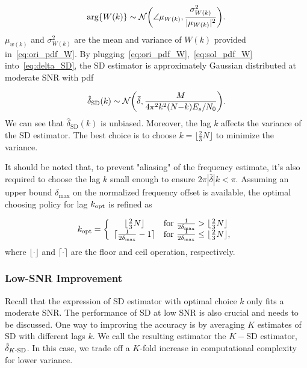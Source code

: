 \begin{equation}
    \label{eq:sol_pdf_W}
    \arg\{W(k)\} \sim \mathcal{N}\bigg(\angle \mu_{W(k)},\frac{\sigma^2_{W(k)}}{|\mu_{W(k)}|^2}\bigg).
  \end{equation}
$\mu_{w(k)}$ and $\sigma^2_{W(k)}$ are the mean and variance of $W(k)$ provided in~\eqref{eq:ori_pdf_W}.
By plugging~\eqref{eq:ori_pdf_W},~\eqref{eq:sol_pdf_W} into~\eqref{eq:delta_SD}, the SD estimator
is approximately Gaussian distributed at moderate SNR with pdf

\begin{equation}
    \label{eq:pdf_delta}
        \hat{\delta}_{\text{SD}}(k) \sim \mathcal{N} \bigg(\bar{\delta},\frac{M}{4\pi^2k^2(N{-}k)E_s/N_0}\bigg).
  \end{equation}  
We can see that $\hat{\delta}_{\text{SD}}(k)$ is unbiased. Moreover, the lag $k$ affects the variance of the SD estimator. 
The best choice is to choose $k=\lfloor\frac{2}{3}N\rfloor$ to minimize the variance.

It should be noted that, to prevent "aliasing" of the frequency estimate, it's also required to choose the lag $k$ small enough to ensure $2\pi |\bar{\delta}| k < \pi$.
Assuming an upper bound $\delta_{\text{max}}$ on the normalized frequency offset is available, 
the optimal choosing policy for lag $k_{\text{opt}}$ is refined as

\begin{equation}
    \label{eq:est_k_opt}
    k_{\text{opt}}=\left\{
      \begin{array}{cl}
        \lfloor\frac{2}{3}N\rfloor
        & \text{for $\frac{1}{2\delta_{\max}}>\lfloor\frac{2}{3}N\rfloor$} \\
        \lceil\frac{1}{2\delta_{\max}}-1\rceil
        & \text{for $\frac{1}{2\delta_{\max}} \leq\lfloor\frac{2}{3}N\rfloor$},
      \end{array}
    \right.
  \end{equation}
where $\lfloor \cdot \rfloor$ and $\lceil \cdot \rceil$ are the floor and ceil operation, respectively.

\subsubsection{Low-SNR Improvement}
Recall that the expression of SD estimator with optimal choice $k$ only fits a moderate SNR.
The performance of SD at low SNR is also crucial and needs to be discussed.
One way to improving the accuracy is by averaging $K$ estimates of SD with different lags $k$.
We call the resulting estimator the $K-$SD estimator, $\hat{\delta}_{K\text{-SD}}$.
In this case, we trade off a $K$-fold increase in computational complexity for lower variance.

